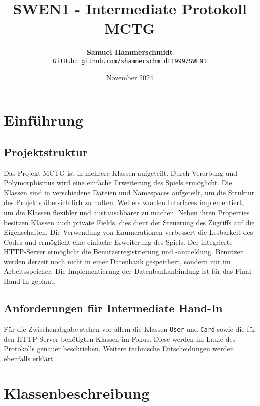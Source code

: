 \documentclass[a4paper, 12pt]{article}
\title{\vspace{-1cm}SWEN1 - Intermediate Protokoll MCTG}
\author{
    \textbf{Samuel Hammerschmidt} \\
    \href{https://github.com/shammerschmidt1999/SWEN1}{\texttt{GitHub: github.com/shammerschmidt1999/SWEN1}}
}
\date{November 2024}
\begin{document}
\maketitle

\section{Einführung}
\subsection{Projektstruktur}
Das Projekt MCTG ist in mehrere Klassen aufgeteilt. Durch Vererbung und Polymorphismus wird eine einfache Erweiterung des Spiels ermöglicht. Die Klassen sind in verschiedene Dateien und Namespaces aufgeteilt, um die Struktur des Projekts übersichtlich zu halten. Weiters wurden Interfaces implementiert, um die Klassen flexibler und austauschbarer zu machen.
Neben ihren Properties besitzen Klassen auch private Fields, dies dient der Steuerung des Zugriffs auf die Eigenschaften.
Die Verwendung von Enumerationen verbessert die Lesbarkeit des Codes und ermöglicht eine einfache Erweiterung des Spiels.
Der integrierte HTTP-Server ermöglicht die Benutzerregistrierung und -anmeldung. Benutzer werden derzeit noch nicht in einer Datenbank gespeichert, sondern nur im Arbeitsspeicher. Die Implementierung der Datenbankanbindung ist für das Final Hand-In geplant.

\subsection{Anforderungen für Intermediate Hand-In}
Für die Zwischenabgabe stehen vor allem die Klassen \texttt{User} und \texttt{Card} sowie die für den HTTP-Server benötigten Klassen im Fokus. Diese werden im Laufe des Protokolls genauer beschrieben. Weitere technische Entscheidungen werden ebenfalls erklärt.

\vspace{0.5cm}
\section{Klassenbeschreibung}
\end{document}

